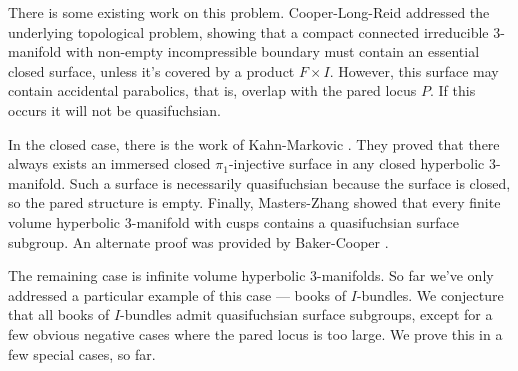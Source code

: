 \documentclass[12pt]{amsart}
\theoremstyle{definition}
\theoremstyle{remark}
\begin{document}
There is some existing work on this problem. Cooper-Long-Reid \cite{CLR}
addressed the underlying topological problem, showing that a compact connected
irreducible 3-manifold with non-empty incompressible boundary  must contain an
essential closed surface, unless it's covered by a product $F\times I$.
However, this surface may contain accidental parabolics, that is, overlap with
the pared locus $P$. If this occurs it will not be quasifuchsian.


In the closed case, there is the work of Kahn-Markovic \cite{KM}. They proved
that there always exists an immersed closed $\pi_1$-injective surface in any
closed hyperbolic 3-manifold.  Such a surface is necessarily quasifuchsian
because the surface is closed, so the pared structure is empty. Finally,
Masters-Zhang \cite{MZ} showed that every finite volume hyperbolic 3-manifold
with cusps contains a quasifuchsian surface subgroup. An alternate proof was
provided by Baker-Cooper \cite{BC}.

The remaining case is infinite volume hyperbolic 3-manifolds. So far we've only
addressed a particular example of this case --- books of $I$-bundles. We
conjecture that all books of $I$-bundles admit quasifuchsian surface subgroups,
except for a few obvious negative cases where the pared locus is too large. We
prove this in a few special cases, so far.

\end{document}
